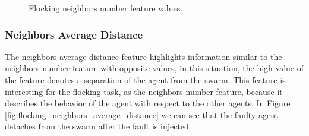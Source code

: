 \documentclass[../../Thesis.tex]{subfiles}
\begin{document}
\begin{figure}
{					}
					\caption{Flocking neighbors number feature values.}
					\label{fig:flocking_neighbors_number}
				\end{figure}
			
			\subsubsection{Neighbors Average Distance}
				The neighbors average distance feature highlights information similar to the neighbors number feature with opposite values, in this situation, the high value of the feature denotes a separation of the agent from the swarm. This feature is interesting for the flocking task, as the neighbors number feature, because it describes the behavior of the agent with respect to the other agents.  In Figure \ref{fig:flocking_neighbors_average_distance} we can see that the faulty agent detaches from the swarm after the fault is injected.
\end{document}
